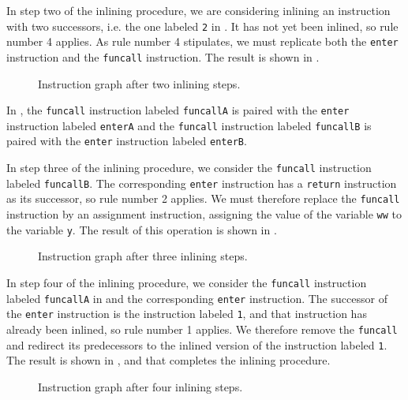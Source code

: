 In step two of the inlining procedure, we are considering inlining an
instruction with two successors, i.e. the one labeled \texttt{2} in
.  It has not yet been inlined, so rule number 4
applies.  As rule number 4 stipulates, we must replicate both the
\texttt{enter} instruction and the \texttt{funcall} instruction.  The
result is shown in .

\begin{figure}
\begin{center}
\end{center}
\caption{\label{fig44}
Instruction graph after two inlining steps.}
\end{figure}

In , the \texttt{funcall} instruction labeled
\texttt{funcallA} is paired with the \texttt{enter} instruction
labeled \texttt{enterA} and the \texttt{funcall} instruction labeled
\texttt{funcallB} is paired with the \texttt{enter} instruction
labeled \texttt{enterB}.

In step three of the inlining procedure, we consider the
\texttt{funcall} instruction labeled \texttt{funcallB}.  The
corresponding \texttt{enter} instruction has a \texttt{return}
instruction as its successor, so rule number 2 applies.  We must
therefore replace the \texttt{funcall} instruction by an assignment
instruction, assigning the value of the variable \texttt{ww} to the
variable \texttt{y}.  The result of this operation is shown in
.

\begin{figure}
\begin{center}
\end{center}
\caption{\label{fig45}
Instruction graph after three inlining steps.}
\end{figure}

In step four of the inlining procedure, we consider the
\texttt{funcall} instruction labeled \texttt{funcallA} in
 and the corresponding \texttt{enter} instruction. The
successor of the \texttt{enter} instruction is the instruction labeled
\texttt{1}, and that instruction has already been inlined, so rule
number 1 applies.  We therefore remove the \texttt{funcall} and
redirect its predecessors to the inlined version of the instruction
labeled \texttt{1}.  The result is shown in , and that
completes the inlining procedure.

\begin{figure}
\begin{center}
\end{center}
\caption{\label{fig46}
Instruction graph after four inlining steps.}
\end{figure}

